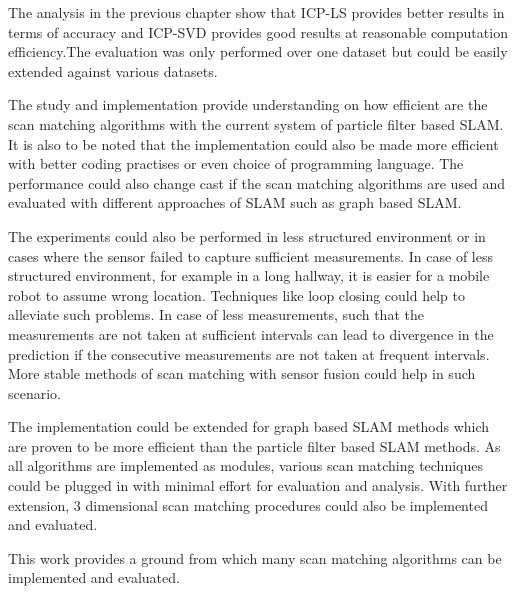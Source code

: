 The analysis in the previous chapter show that ICP-LS provides better results in terms of accuracy and ICP-SVD provides good results at reasonable computation efficiency.The evaluation was only performed over one dataset but could be easily extended  against various datasets.
\par
The study and implementation provide understanding on how efficient are the scan matching algorithms with the current system of particle filter based SLAM. It is also to be noted that the implementation could also be made more efficient with better coding practises or even choice of programming language. The performance could also change cast if the scan matching algorithms are used and evaluated with different approaches of SLAM such as graph based SLAM. 
\par 
The experiments could also be performed in less structured environment or in cases where the sensor failed to capture sufficient measurements. In case of less structured environment, for example in a long hallway, it is easier for a mobile robot to assume wrong location. Techniques like loop closing could help to alleviate such problems. In case of less measurements, such that the measurements are not taken at sufficient intervals can lead to divergence in the prediction if the consecutive measurements are not taken at frequent intervals. More stable methods of scan matching with sensor fusion could help in such scenario.
\par
The implementation could be extended for graph based SLAM methods which are proven to be more efficient than the particle filter based SLAM methods. As all algorithms are implemented as modules, various scan matching techniques could be plugged in with minimal effort for evaluation and analysis. With further extension, 3 dimensional scan matching procedures could also be implemented and evaluated.

This work provides a ground from which many scan matching algorithms can be implemented and evaluated.